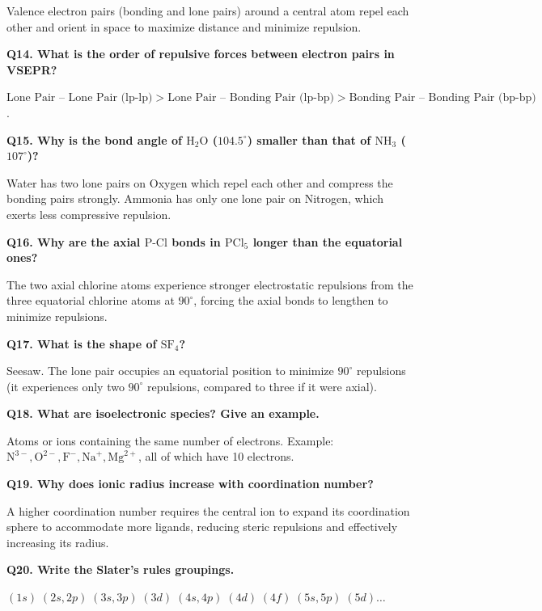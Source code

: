 \documentclass[12pt,a4paper]{article}
\newcommand{\Q}[1]{\textbf{#1}\par\noindent\ignorespaces}
\begin{document}
\begin{tcolorbox}[exambox, title={Frequently Asked / Viva Questions}]
  Valence electron pairs (bonding and lone pairs) around a central atom repel each other and orient in space to maximize distance and minimize repulsion.
  \par\vspace{6pt}
  \Q{Q14. What is the order of repulsive forces between electron pairs in VSEPR?}
  $\text{Lone Pair -- Lone Pair (lp-lp)} > \text{Lone Pair -- Bonding Pair (lp-bp)} > \text{Bonding Pair -- Bonding Pair (bp-bp)}$.
  \par\vspace{6pt}
  \Q{Q15. Why is the bond angle of $\text{H}_2\text{O}$ ($104.5^\circ$) smaller than that of $\text{NH}_3$ ($107^\circ$)?}
  Water has two lone pairs on Oxygen which repel each other and compress the bonding pairs strongly. Ammonia has only one lone pair on Nitrogen, which exerts less compressive repulsion.
  \par\vspace{6pt}
  \Q{Q16. Why are the axial $\text{P-Cl}$ bonds in $\text{PCl}_5$ longer than the equatorial ones?}
  The two axial chlorine atoms experience stronger electrostatic repulsions from the three equatorial chlorine atoms at $90^\circ$, forcing the axial bonds to lengthen to minimize repulsions.
  \par\vspace{6pt}
  \Q{Q17. What is the shape of $\text{SF}_4$?}
  Seesaw. The lone pair occupies an equatorial position to minimize $90^\circ$ repulsions (it experiences only two $90^\circ$ repulsions, compared to three if it were axial).
  \par\vspace{6pt}
  \Q{Q18. What are isoelectronic species? Give an example.}
  Atoms or ions containing the same number of electrons. Example: $\text{N}^{3-}, \text{O}^{2-}, \text{F}^-, \text{Na}^+, \text{Mg}^{2+}$, all of which have 10 electrons.
  \par\vspace{6pt}
  \Q{Q19. Why does ionic radius increase with coordination number?}
  A higher coordination number requires the central ion to expand its coordination sphere to accommodate more ligands, reducing steric repulsions and effectively increasing its radius.
  \par\vspace{6pt}
  \Q{Q20. Write the Slater's rules groupings.}
  $(1s) \; (2s, 2p) \; (3s, 3p) \; (3d) \; (4s, 4p) \; (4d) \; (4f) \; (5s, 5p) \; (5d) \dots$
  \par\vspace{6pt}

\end{tcolorbox}
\end{document}
